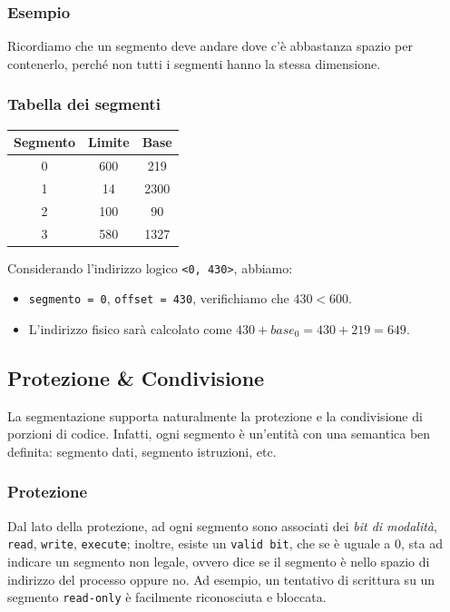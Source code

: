 \documentclass[a4paper,12pt, twoside]{report}
\begin{document}
\subsubsection{Esempio}

Ricordiamo che un segmento deve andare dove c'\`e abbastanza spazio per contenerlo, perch\'e non tutti 
i segmenti hanno la stessa dimensione.
\subsubsection{Tabella dei segmenti}
\begin{center}
    \begin{tabular}{c c c}
        \hline 
        \hline
        Segmento & Limite & Base \\
        \hline 
        \hline 
        0 & 600 & 219 \\
        \hline 
        1 & 14 & 2300 \\
        \hline
        2 & 100 & 90 \\
        \hline 
        3 & 580 & 1327 \\
        \hline
        \hline
    \end{tabular} 
\end{center}

Considerando l'indirizzo logico \texttt{<0, 430>}, abbiamo:
\begin{itemize}
    \item \texttt{segmento = 0}, \texttt{offset = 430}, verifichiamo che $430 < 600$.
    \item L'indirizzo fisico sar\`a calcolato come $430 + base_0 = 430 + 219 = 649$.
\end{itemize}

\subsection{Protezione \& Condivisione}
La segmentazione supporta naturalmente la protezione e la condivisione di porzioni di codice. Infatti,
ogni segmento \`e un'entit\`a con una semantica ben definita: segmento dati, segmento istruzioni, etc.

\subsubsection{Protezione}
Dal lato della protezione, ad ogni segmento sono associati dei \emph{bit di modalit\`a}, \texttt{read},
\texttt{write}, \texttt{execute}; inoltre, esiste un \texttt{valid bit}, che se \`e uguale a 0, sta 
ad indicare un segmento non legale, ovvero dice se il segmento \`e nello spazio di indirizzo del 
processo oppure no. Ad esempio, un tentativo di scrittura su un segmento \texttt{read-only} \`e 
facilmente riconosciuta e bloccata.
\end{document}

